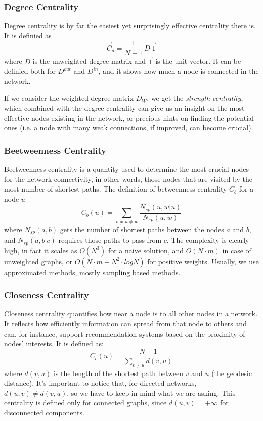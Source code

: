 \documentclass[12pt,a4paper]{article}
\begin{document}
\subsubsection*{Degree Centrality}
Degree centrality is by far the easiest yet surprisingly effective centrality there is. It is definied as
$$
\vec{C}_d = \frac{1}{N-1} \,D \, \vec{1}
$$
where $D$ is the unweighted degree matrix and $\vec{1}$ is the unit vector.
It can be definied both for $D^{out}$ and $D^{in}$, and it shows how much a node is connected in the network.

If we consider the weighted degree matrix $D_W$, we get the \textit{strength centrality}, which combined with the degree centrality can give us an insight on the most effective nodes existing in the network, or precious hints on finding the potential ones (i.e. a node with many weak connections, if improved, can become crucial).

\subsubsection*{Beetweenness Centrality}
Beetweenness centrality is a quantity used to determine the most crucial nodes for the network connectivity, in other words, those nodes that are visited by the most number of shortest paths. The definition of betweenness centrality $C_b$ for a node $u$
$$
C_b(u) = \sum_{v\neq u \neq w} \frac{N_{sp}(u,w | u)}{N_{sp}(u,w)}
$$
where $N_{sp}(a,b)$ gets the number of shortest paths between the nodes $a$ and $b$, and $N_{sp}(a,b | c)$ requires those paths to pass from $c$.
The complexity is clearly high, in fact it scales as
$O(N^3)$ for a naive solution, and $O(N\cdot m)$ in case of unweighted graphs, or $O(N\cdot m + N^2\cdot logN)$ for positive weights.
Usually, we use approximated methods, mostly sampling based methods.


\subsubsection*{Closeness Centrality}
Closeness centrality quantifies how near a node is to all other nodes in a network. It reflects how efficiently information can spread from that node to others and can, for instance, support recommendation systems based on the proximity of nodes' interests. It is defined as:
$$
C_c(u) = \frac{N-1}{\sum_{v\neq u} d(v,u)}
$$
where $d(v,u)$ is the length of the shortest path between $v$ and $u$ (the geodesic distance).
It's important to notice that, for directed networks, $d(u,v)\neq d(v,u)$, so we have to keep in mind what we are asking.
This centrality is defined only for connected graphs, since $d(u,v)=+\infty$ for disconnected components.
\end{document}
